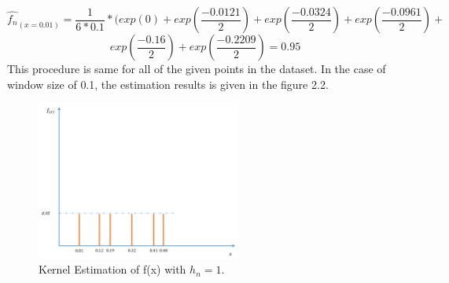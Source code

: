 \documentclass[12pt]{article}
\numberwithin{equation}{section}
\numberwithin{table}{section}
\numberwithin{figure}{section}
\begin{document}
\begin{enumerate}[label=(\alph*)]
	$$
		\hat{f_n}_{(x =0.01)} = \frac{1}{6*0.1} * (exp(0) + exp(\frac{-0.0121}{2}) +
		 exp(\frac{-0.0324}{2}) + exp(\frac{-0.0961}{2}) + 
	$$
	$$
	exp(\frac{-0.16}{2}) + exp(\frac{-0.2209}{2}) = 0.95
	$$
	\newpage
	This procedure is same for all of the given points in the dataset. In the case of window size of 0.1, the estimation results is given in the figure 2.2.
	\begin{figure}[!h]\centering
		\includegraphics[width=0.6\textwidth]{2_a_2.PNG}
		\caption{Kernel Estimation of f(x) with $h_n = 1$.}
		\label{pl1}
	\end{figure}
\end{enumerate}
\end{document}
